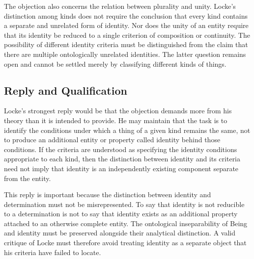 \label{para:VS.B01.P01.C08.S08.SS12.P006}

The objection also concerns the relation
between plurality and unity. Locke's
distinction among kinds does not require
the conclusion that every kind contains
a separate and unrelated form of identity.
Nor does the unity of an entity require
that its identity be reduced to a single
criterion of composition or continuity.
The possibility of different identity
criteria must be distinguished from the
claim that there are multiple ontologically
unrelated identities. The latter question
remains open and cannot be settled merely
by classifying different kinds of things.



\subsection{Reply and Qualification}
\label{subsec:ch08-locke-reply}

\label{para:VS.B01.P01.C08.S08.SS13.P001}

Locke's strongest reply would be that the objection
demands more from his theory than it is intended
to provide. He may maintain that the task is to
identify the conditions under which a thing of
a given kind remains the same, not to produce
an additional entity or property called identity
behind those conditions. If the criteria are
understood as specifying the identity conditions
appropriate to each kind, then the distinction
between identity and its criteria need not imply
that identity is an independently existing
component separate from the entity.

\label{para:VS.B01.P01.C08.S08.SS13.P002}

This reply is important because the distinction
between identity and determination must not
be misrepresented. To say that identity is
not reducible to a determination is not to
say that identity exists as an additional
property attached to an otherwise complete
entity. The ontological inseparability of
Being and identity must be preserved alongside
their analytical distinction. A valid critique
of Locke must therefore avoid treating identity
as a separate object that his criteria have
failed to locate.

